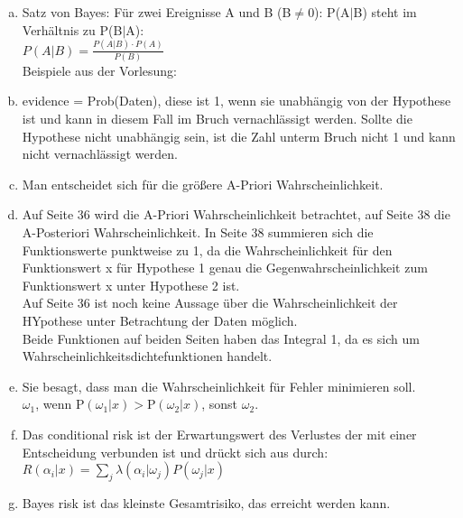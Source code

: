 
\begin{aufgabe}
\end{aufgabe}
\begin{enumerate}[a)]
	\item Satz von Bayes: Für zwei Ereignisse A und B (B$\not=$0): P(A$|$B) steht im Verhältnis zu P(B$|$A):\\
	$P(A|B)=\frac{P(A|B)\cdot P(A)}{P(B)}$\\
	Beispiele aus der Vorlesung:\\
	
	\item evidence = Prob(Daten), diese ist 1, wenn sie unabhängig von der Hypothese ist und kann in diesem Fall im Bruch vernachlässigt werden. Sollte die Hypothese nicht unabhängig sein, ist die Zahl unterm Bruch nicht 1 und kann nicht vernachlässigt werden.\\
	
	\item Man entscheidet sich für die größere A-Priori Wahrscheinlichkeit.\\
	
	\item Auf Seite 36 wird die A-Priori Wahrscheinlichkeit betrachtet, auf Seite 38 die A-Posteriori Wahrscheinlichkeit. In Seite 38 summieren sich die Funktionswerte punktweise zu 1, da die Wahrscheinlichkeit für den Funktionswert x für Hypothese 1 genau die Gegenwahrscheinlichkeit zum Funktionswert x unter Hypothese 2 ist.\\
	Auf Seite 36 ist noch keine Aussage über die Wahrscheinlichkeit der HYpothese unter Betrachtung der Daten möglich.\\
	Beide Funktionen auf beiden Seiten haben das Integral 1, da es sich um Wahrscheinlichkeitsdichtefunktionen handelt.\\
	
	\item Sie besagt, dass man die Wahrscheinlichkeit für Fehler minimieren soll.\\
	$\omega_1 $, wenn P$(\omega_1|x)> $P$(\omega_2|x)$, sonst $\omega_2$.\\
	
	\item Das conditional risk ist der Erwartungswert des Verlustes der mit einer Entscheidung verbunden ist und drückt sich aus durch:\\
	$R(\alpha_i|x)=\sum_j\lambda(\alpha_i|\omega_j)P(\omega_j|x)$\\
	
	\item Bayes risk ist das kleinste Gesamtrisiko, das erreicht werden kann.\\
	
	
	\end{enumerate}
